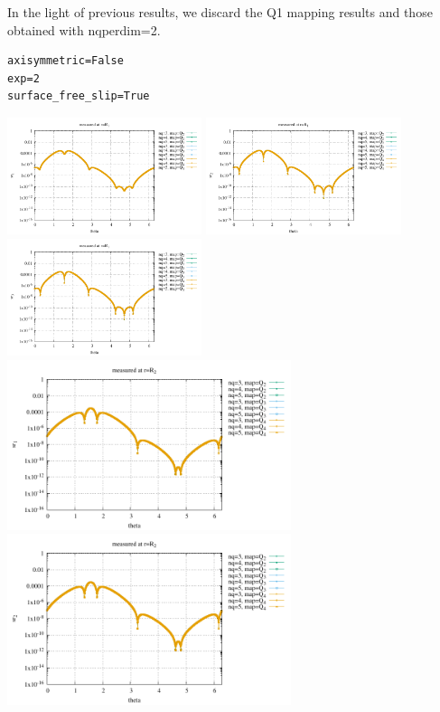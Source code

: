 In the light of previous results, we discard the Q1 mapping results 
and those obtained with {\python nqperdim=2}.

\begin{lstlisting}
axisymmetric=False
exp=2
surface_free_slip=True
\end{lstlisting}


\begin{center}
\includegraphics[width=5.7cm]{python_codes/fieldstone_152/results/exp2/sr1_R1}
\includegraphics[width=5.7cm]{python_codes/fieldstone_152/results/exp2/sr2_R1}
\includegraphics[width=5.7cm]{python_codes/fieldstone_152/results/exp2/sr3_R1}\\
\includegraphics[width=8.3cm]{python_codes/fieldstone_152/results/exp2/sr1_R2}
\includegraphics[width=8.3cm]{python_codes/fieldstone_152/results/exp2/sr2_R2}\\

\end{center}
